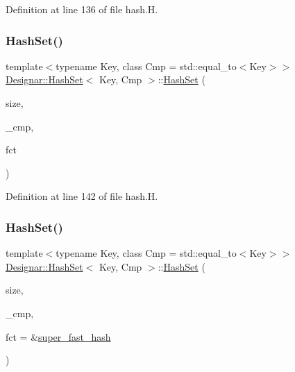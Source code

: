 Definition at line 136 of file hash.\+H.

\mbox{\label{class_designar_1_1_hash_set_aa57bbddb93c59eda7551cf9cf6b9220e}} 
\subsubsection{\texorpdfstring{Hash\+Set()}{HashSet()}\hspace{0.1cm}{\footnotesize\ttfamily [3/12]}}
{\footnotesize\ttfamily template$<$typename Key, class Cmp = std\+::equal\+\_\+to$<$\+Key$>$$>$ \\
\hyperlink{class_designar_1_1_hash_set}{Designar\+::\+Hash\+Set}$<$ Key, Cmp $>$\+::\hyperlink{class_designar_1_1_hash_set}{Hash\+Set} (\begin{DoxyParamCaption}\item[{\hyperlink{namespace_designar_aa72662848b9f4815e7bf31a7cf3e33d1}{nat\+\_\+t}}]{size,  }\item[{Cmp \&\&}]{\+\_\+cmp,  }\item[{\hyperlink{class_designar_1_1_hash_set_a05d8d111665c25bc17290c01fa299398}{Hash\+Fct\+Type}}]{fct }\end{DoxyParamCaption})\hspace{0.3cm}{\ttfamily [inline]}}



Definition at line 142 of file hash.\+H.

\mbox{\label{class_designar_1_1_hash_set_ac9204afce59af28d1360c50f11b5694e}} 
\subsubsection{\texorpdfstring{Hash\+Set()}{HashSet()}\hspace{0.1cm}{\footnotesize\ttfamily [4/12]}}
{\footnotesize\ttfamily template$<$typename Key, class Cmp = std\+::equal\+\_\+to$<$\+Key$>$$>$ \\
\hyperlink{class_designar_1_1_hash_set}{Designar\+::\+Hash\+Set}$<$ Key, Cmp $>$\+::\hyperlink{class_designar_1_1_hash_set}{Hash\+Set} (\begin{DoxyParamCaption}\item[{\hyperlink{namespace_designar_aa72662848b9f4815e7bf31a7cf3e33d1}{nat\+\_\+t}}]{size,  }\item[{Cmp \&}]{\+\_\+cmp,  }\item[{\hyperlink{class_designar_1_1_hash_set_a7a8b0a4970519ebc9ccc1ad247d0639f}{Hash\+Fct\+Ptr}}]{fct = {\ttfamily \&\hyperlink{namespace_designar_afd5712d16b3ae1c1c7d59f1004cd96fd}{super\+\_\+fast\+\_\+hash}} }\end{DoxyParamCaption})\hspace{0.3cm}{\ttfamily [inline]}}



